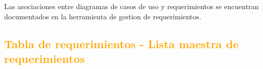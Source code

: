 Las asociaciones entre diagramas de casos de uso y requerimientos se encuentran
documentados en la herramienta de gestion de requerimientos. 


\newpage
\subsection{\textcolor{orange}{Tabla de requerimientos - Lista maestra de
requerimientos}} 
